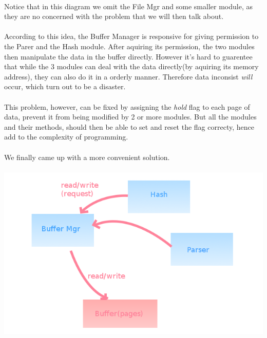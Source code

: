 \documentclass{article}
\begin{document}
        \paragraph{}
            Notice that in this diagram we omit the File Mgr and some smaller module, as they are no concerned with the problem that we will then talk about.
        \paragraph{}
            According to this idea, the Buffer Manager is responsive for giving permission to the Parer and the Hash module. After aquiring its permission, the two modules then manipulate the data in the buffer directly. However it's hard to guarentee that while the 3 modules can deal with the data directly(by aquiring its memory address), they can also do it in a orderly manner. Therefore data inconsist \emph{will} occur, which turn out to be a disaster.
        \paragraph{}
            This problem, however, can be fixed by assigning the \emph{hold} flag to each page of data, prevent it from being modified by 2 or more modules. But all the modules and their methods, should then be able to set and reset the flag correcty, hence add to the complexity of programming.
        \paragraph{}
            We finally came up with a more convenient solution.
        \paragraph{} \includegraphics[scale=0.5]{img/arch2.png}
\end{document}
